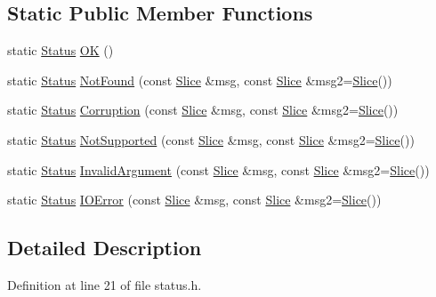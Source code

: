 \subsection*{Static Public Member Functions}
\begin{DoxyCompactItemize}
\item 
static \hyperlink{classleveldb_1_1_status}{Status} \hyperlink{classleveldb_1_1_status_a8e3720d233281c874a53c17e081f51b3}{O\+K} ()
\item 
static \hyperlink{classleveldb_1_1_status}{Status} \hyperlink{classleveldb_1_1_status_a9e5beb5b2e758f041e0c012426e7b1b8}{Not\+Found} (const \hyperlink{classleveldb_1_1_slice}{Slice} \&msg, const \hyperlink{classleveldb_1_1_slice}{Slice} \&msg2=\hyperlink{classleveldb_1_1_slice}{Slice}())
\item 
static \hyperlink{classleveldb_1_1_status}{Status} \hyperlink{classleveldb_1_1_status_a755b1ee5b0029cf9ea1128f1cdff5855}{Corruption} (const \hyperlink{classleveldb_1_1_slice}{Slice} \&msg, const \hyperlink{classleveldb_1_1_slice}{Slice} \&msg2=\hyperlink{classleveldb_1_1_slice}{Slice}())
\item 
static \hyperlink{classleveldb_1_1_status}{Status} \hyperlink{classleveldb_1_1_status_a66c6b7171cedb55651e34e5df9a14705}{Not\+Supported} (const \hyperlink{classleveldb_1_1_slice}{Slice} \&msg, const \hyperlink{classleveldb_1_1_slice}{Slice} \&msg2=\hyperlink{classleveldb_1_1_slice}{Slice}())
\item 
static \hyperlink{classleveldb_1_1_status}{Status} \hyperlink{classleveldb_1_1_status_aefef9f88d0a6ca6d34bd9dec1670309e}{Invalid\+Argument} (const \hyperlink{classleveldb_1_1_slice}{Slice} \&msg, const \hyperlink{classleveldb_1_1_slice}{Slice} \&msg2=\hyperlink{classleveldb_1_1_slice}{Slice}())
\item 
static \hyperlink{classleveldb_1_1_status}{Status} \hyperlink{classleveldb_1_1_status_ada6143081d41803808f77287153f96b7}{I\+O\+Error} (const \hyperlink{classleveldb_1_1_slice}{Slice} \&msg, const \hyperlink{classleveldb_1_1_slice}{Slice} \&msg2=\hyperlink{classleveldb_1_1_slice}{Slice}())
\end{DoxyCompactItemize}


\subsection{Detailed Description}


Definition at line 21 of file status.\+h.




